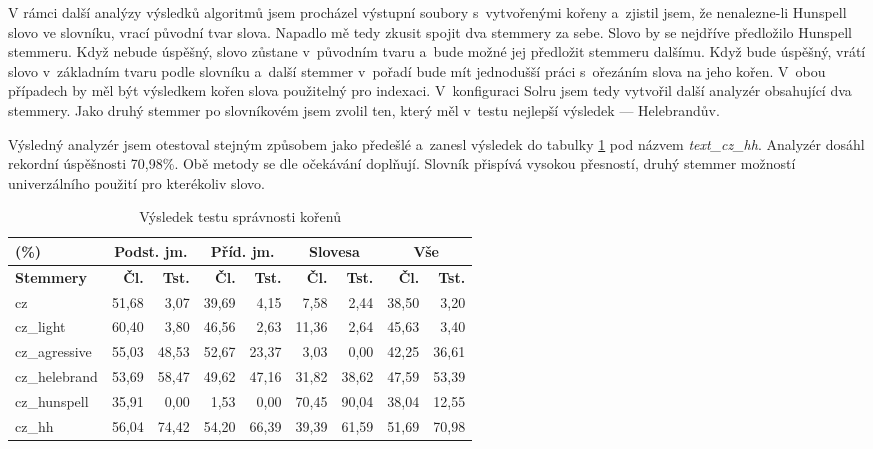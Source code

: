V rámci další analýzy výsledků algoritmů jsem procházel výstupní soubory s~vytvořenými kořeny a~zjistil jsem, že nenalezne-li Hunspell slovo ve slovníku, vrací původní tvar slova. Napadlo mě tedy zkusit spojit dva stemmery za sebe. Slovo by se nejdříve předložilo Hunspell stemmeru. Když nebude úspěšný, slovo zůstane v~původním tvaru a~bude možné jej předložit stemmeru dalšímu. Když bude úspěšný, vrátí slovo v~základním tvaru podle slovníku a~další stemmer v~pořadí bude mít jednodušší práci s~ořezáním slova na jeho kořen. V~obou případech by měl být výsledkem kořen slova použitelný pro indexaci. V~konfiguraci Solru jsem tedy vytvořil další analyzér obsahující dva stemmery. Jako druhý stemmer po slovníkovém jsem zvolil ten, který měl v~testu nejlepší výsledek --- Helebrandův.

Výsledný analyzér jsem otestoval stejným způsobem jako předešlé a~zanesl výsledek do tabulky \ref{tab:test_stm} pod názvem \emph{text\_cz\_hh}. Analyzér dosáhl rekordní úspěšnosti 70,98\%. Obě metody se dle očekávání doplňují. Slovník přispívá vysokou přesností, druhý stemmer možností univerzálního použití pro kterékoliv slovo.

\begin{table}
\begin{center}
\begin{tabular}{|l|r|r|r|r|r|r|r|r|}
\hline
(\%) & \multicolumn{2}{|c|}{\textbf{Podst. jm.}} & \multicolumn{2}{|c|}{\textbf{Příd. jm.}} & \multicolumn{2}{|c|}{\textbf{Slovesa}} & \multicolumn{2}{|c|}{\textbf{Vše}} \\ \hline
\textbf{Stemmery} & \textbf{Čl.} & \textbf{Tst.} & \textbf{Čl.} & \textbf{Tst.} & \textbf{Čl.} & \textbf{Tst.} & \textbf{Čl.} & \textbf{Tst.} \\ \hline
cz & 51,68 & 3,07 & 39,69 & 4,15 & 7,58 & 2,44 & 38,50 & 3,20 \\ \hline
cz\_light & 60,40 & 3,80 & 46,56 & 2,63 & 11,36 & 2,64 & 45,63 & 3,40 \\ \hline
cz\_agressive & 55,03 & 48,53 & 52,67 & 23,37 & 3,03 & 0,00 & 42,25 & 36,61 \\ \hline
cz\_helebrand & 53,69 & 58,47 & 49,62 & 47,16 & 31,82 & 38,62 & 47,59 & 53,39 \\ \hline
cz\_hunspell & 35,91 & 0,00 & 1,53 & 0,00 & 70,45 & 90,04 & 38,04 & 12,55 \\ \hline
\hline
cz\_hh & 56,04 & 74,42 & 54,20 & 66,39 & 39,39 & 61,59 & 51,69 & 70,98 \\ \hline
\end{tabular}
\end{center}
\caption{Výsledek testu správnosti kořenů}
\label{tab:test_stm}
\end{table}

